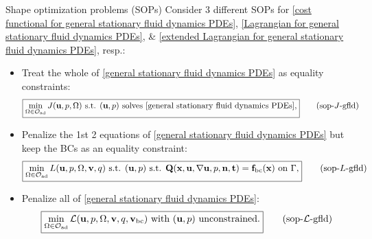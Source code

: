 \documentclass[10pt
hyperref={
    pdfauthor={Hong Quan Ba Nguyen},
    pdftitle={Optimal Shape Design of Air Ducts in Combustion Engines: Design a General Framework},
    pdfsubject={Talk},
    pdfcreator={LaTeX},
}
]{beamer}
\begin{document}
\begin{frame}{Shape optimization problems (SOPs)}
    Consider 3 different SOPs for \eqref{cost functional for general stationary fluid dynamics PDEs}, \eqref{Lagrangian for general stationary fluid dynamics PDEs}, {\small\&} \eqref{extended Lagrangian for general stationary fluid dynamics PDEs}, resp.:
    \begin{itemize}
        \item Treat the whole of \eqref{general stationary fluid dynamics PDEs} as equality constraints:
        \begin{align}
            &\boxed{\min_{\Omega\in\mathcal{O}_{\rm ad}} J(\textbf{u},p,\Omega) \mbox{ s.t. } (\textbf{u},p) \mbox{ solves \eqref{general stationary fluid dynamics PDEs}},}\label{SOP for cost functional for general stationary fluid dynamics PDEs}\tag{sop-$J$-gfld}
        \end{align}
        \item Penalize the 1st 2 equations of \eqref{general stationary fluid dynamics PDEs} but keep the BCs as an equality constraint:
        \begin{align}
            \boxed{\min_{\Omega\in\mathcal{O}_{\rm ad}} L(\textbf{u},p,\Omega,\textbf{v},q) \mbox{ s.t. } (\textbf{u},p) \mbox{ s.t. } \textbf{Q}(\textbf{x},\textbf{u},\nabla\textbf{u},p,\textbf{n},\textbf{t}) = \textbf{f}_{\rm bc}(\textbf{x}) \mbox{ on } \Gamma,}\label{SOP for Lagrangian for general stationary fluid dynamics PDEs}\tag{sop-$L$-gfld}
        \end{align}
        \item Penalize all of \eqref{general stationary fluid dynamics PDEs}:
        \begin{align}
            \boxed{\min_{\Omega\in\mathcal{O}_{\rm ad}} \mathcal{L}(\textbf{u},p,\Omega,\textbf{v},q,\textbf{v}_{\rm bc}) \mbox{ with } (\textbf{u},p) \mbox{ unconstrained}.}\label{SOP for extended Lagrangian for general stationary fluid dynamics PDEs}\tag{sop-$\mathcal{L}$-gfld}
        \end{align}
    \end{itemize}
\end{frame}
\end{document}
